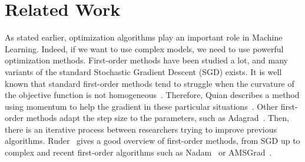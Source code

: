\documentclass[conference]{IEEEtran}
\begin{document}


\section{Related Work}
\label{sec:rel_work}

As stated earlier, optimization algorithms play an important role in Machine Learning. Indeed, if we want to use complex models, we need to use powerful optimization methods. First-order methods have been studied a lot, and many variants of the standard Stochastic Gradient Descent (SGD) exists. It is well known that standard first-order methods tend to struggle when the curvature of the objective function is not homogeneous~\cite{sutton_two_1986}. Therefore, Quian describes a method using momentum to help the gradient in these particular situations~\cite{qian_momentum_1999}. Other first-order methods adapt the step size to the parameters, such as Adagrad~\cite{duchi_adaptive_2011}. Then, there is an iterative process between researchers trying to improve previous algorithms. Ruder~\cite{ruder_overview_2016} gives a good overview of first-order methods, from SGD up to complex and recent first-order algorithms such as Nadam~\cite{dozat_incorporating_2016} or AMSGrad~\cite{reddi_convergence_2018}. \\
\end{document}
